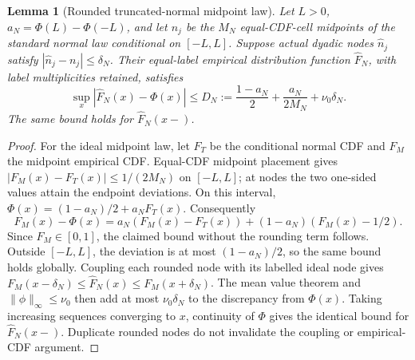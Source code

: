 \documentclass[11pt]{article}
\newtheorem{lemma}[theorem]{Lemma}
\begin{document}
\begin{lemma}[Rounded truncated-normal midpoint law]
Let $L>0$, $a_N=\Phi(L)-\Phi(-L)$, and let $n_j$ be the $M_N$
equal-CDF-cell midpoints of the standard normal law conditional on
$[-L,L]$. Suppose actual dyadic nodes $\widehat n_j$ satisfy
$|\widehat n_j-n_j|\leq\delta_N$. Their equal-label empirical
distribution function $\widehat F_N$, with label multiplicities retained,
satisfies
\[
 \sup_x|\widehat F_N(x)-\Phi(x)|
 \leq D_N:=\frac{1-a_N}{2}+\frac{a_N}{2M_N}+\nu_0\delta_N.
 \tag{S3}\label{eq:normal-cdf}
\]
The same bound holds for $\widehat F_N(x-)$.
\end{lemma}
\begin{proof}
For the ideal midpoint law, let $F_T$ be the conditional normal CDF and
$F_M$ the midpoint empirical CDF. Equal-CDF midpoint placement gives
$|F_M(x)-F_T(x)|\leq1/(2M_N)$ on $[-L,L]$; at nodes the two
one-sided values attain the endpoint deviations. On this interval,
$\Phi(x)=(1-a_N)/2+a_NF_T(x)$. Consequently
\[
 F_M(x)-\Phi(x)
  =a_N(F_M(x)-F_T(x))+(1-a_N)(F_M(x)-1/2).
\]
Since $F_M\in[0,1]$, the claimed bound without the rounding term follows.
Outside $[-L,L]$, the deviation is at most $(1-a_N)/2$, so the same
bound holds globally. Coupling each rounded node with its labelled
ideal node gives
$F_M(x-\delta_N)\leq\widehat F_N(x)\leq F_M(x+\delta_N)$.
The mean value theorem and $\|\phi\|_\infty\leq\nu_0$ then add
at most $\nu_0\delta_N$ to the discrepancy from $\Phi(x)$.
Taking increasing sequences converging to $x$, continuity of $\Phi$
gives the identical bound for $\widehat F_N(x-)$. Duplicate rounded
nodes do not invalidate the coupling or empirical-CDF argument.
\end{proof}
\end{document}
